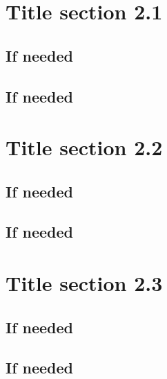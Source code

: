 \section{Title section 2.1}



\subsection{If needed}



\subsection{If needed}



\section{Title section 2.2}

\subsection{If needed}


\subsection{If needed}


\section{Title section 2.3}


\subsection{If needed}



\subsection{If needed}

